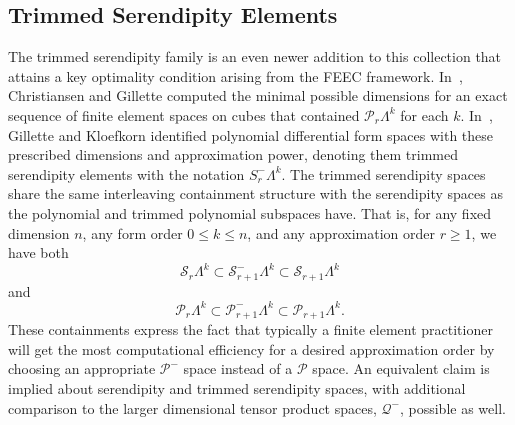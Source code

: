\documentclass[format=acmsmall,screen,timestamp=false,a4paper]{acmart}
\newcommand{\calP}{\mathcal{P}}
\newcommand{\calQ}{\mathcal{Q}}
\newcommand{\calS}{\mathcal{S}}
\begin{document}
  \subsection{Trimmed Serendipity Elements}
    The trimmed serendipity family is an even newer addition to this collection that attains a key optimality condition arising from the FEEC framework.
	In~\cite{christiansen2016constructions}, Christiansen and Gillette computed the minimal possible dimensions for an exact sequence of finite element spaces on cubes that contained $\calP_r\Lambda^k$ for each $k$.
	In~\cite{gillette2019trimmed}, Gillette and Kloefkorn identified polynomial differential form spaces with these prescribed dimensions and approximation power, denoting them trimmed serendipity elements with the notation $S^-_r\Lambda^k$.  
	The trimmed serendipity spaces share the same interleaving containment structure with the serendipity spaces as the polynomial and trimmed polynomial subspaces have.  That is, for any fixed dimension $n$, any form order $0\leq k\leq n$, and any approximation order $r\geq 1$, we have both
\begin{equation*}
      \calS_r \Lambda^k \subset \calS^-_{r+1} \Lambda^k \subset \calS_{r+1} \Lambda^k
  \end{equation*}
 \noindent and   
   \begin{equation*}
      \calP_r \Lambda^k \subset \calP^-_{r+1} \Lambda^k \subset \calP_{r+1} \Lambda^k.
  \end{equation*}
	These containments express the fact that typically a finite element practitioner will get the most computational efficiency for a desired approximation order by choosing an appropriate $\calP^-$ space instead of a $\calP$ space.
	An equivalent claim is implied about serendipity and trimmed serendipity spaces, with additional comparison to the larger dimensional tensor product spaces, $\calQ^-$, possible as well.


    
    
  
\end{document}
